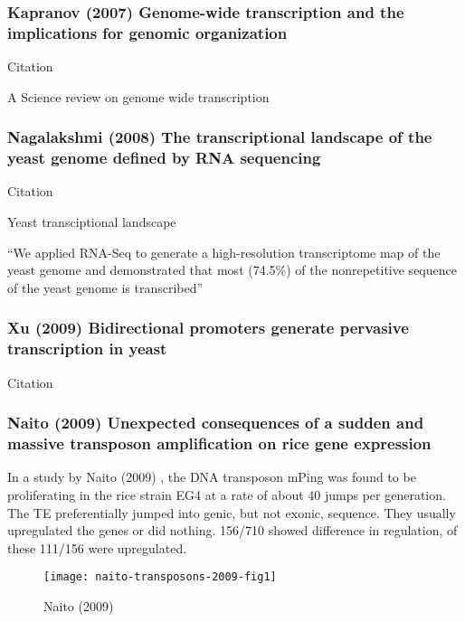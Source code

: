     \subsubsection{Kapranov (2007) Genome-wide transcription and the
    implications for genomic organization}

      Citation \cite{kapranov_genome-wide_2007}

      A Science review on genome wide transcription 

    \subsubsection{Nagalakshmi (2008) The transcriptional landscape of the
    yeast genome defined by RNA sequencing}

      Citation \cite{nagalakshmi_transcriptional_2008}

      Yeast transciptional landscape 

      ``We applied RNA-Seq to generate a high-resolution transcriptome
      map of the yeast genome and demonstrated that most (74.5\%) of the
      nonrepetitive sequence of the yeast genome is transcribed''

    \subsubsection{Xu (2009) Bidirectional promoters generate pervasive
    transcription in yeast}
    
      Citation \cite{xu_bidirectional_2009}

    \subsubsection{Naito (2009) Unexpected consequences of a sudden and
    massive transposon amplification on rice gene expression}

      In a study by Naito (2009) \cite{naito_unexpected_2009}, the DNA
      transposon mPing was found to be proliferating in the rice strain EG4
      at a rate of about 40 jumps per generation. The TE preferentially
      jumped into genic, but not exonic, sequence. They usually upregulated
      the genes or did nothing. 156/710 showed difference in regulation, of
      these 111/156 were upregulated. 

      \begin{figure}[h!]
        \centering
        \texttt{[image: naito-transposons-2009-fig1]}
        \caption{Naito (2009) \cite{naito_unexpected_2009}}
      \end{figure}

